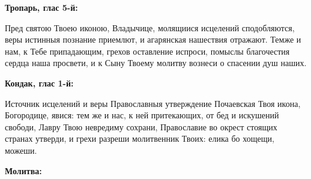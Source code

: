 
\bfseries Тропарь, глас 5-й:\normalfont{}\nopagebreak


Пред святою Твоею иконою, Владычице, молящиися исцелений сподобляются, веры истинныя познание приемлют, и агарянская нашествия отражают. Темже и нам, к Тебе припадающим, грехов оставление испроси, помыслы благочестия сердца наша просвети, и к Сыну Твоему молитву вознеси о спасении душ наших.


\medskip


\bfseries Кондак, глас 1-й:\normalfont{}\nopagebreak


Источник исцелений и веры Православныя утверждение Почаевская Твоя икона, Богородице, явися: тем же и нас, к ней притекающих, от бед и искушений свободи, Лавру Твою невредиму сохрани, Православие во окрест стоящих странах утверди, и грехи разреши молитвенник Твоих: елика бо хощещи, можеши.


\medskip


\bfseries Молитва:\normalfont{}\nopagebreak



